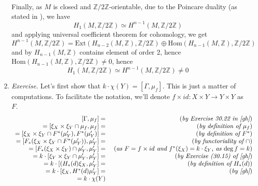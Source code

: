 \documentclass[8pt]{article} %
\newcommand{\Z}{\mathbb{Z}}
\newcommand{\tZ}{\mathbb{Z}/2\mathbb{Z}}
\newcommand{\Hom}{\mbox{Hom}}
\newcommand{\Ext}{\mbox{Ext}}
\begin{document}
\begin{enumerate}[label=\bfseries \arabic*.]
{		Finally, as $M$ is closed and $\tZ$-orientable, due to the Poincare duality (as stated in \cite[Theorem 3.30]{hatcher}), we have 
		\[H_1(M,\tZ)\simeq H^{n-1}(M,\tZ)\]
		and applying universal coefficient theorem for cohomology, we get
		\[H^{n-1}(M,\tZ)=\Ext(H_{n-2}(M,\Z),\tZ)\oplus\Hom(H_{n-1}(M,\Z),\tZ)\]
		and by \cite[Corollary 3.28]{hatcher} $H_{n-1}(M,\Z)$ contains element of order 2, hence $\Hom(H_{n-1}(M,\Z),\tZ)\neq0$, hence
		\[H_1(M,\tZ)\simeq H^{n-1}(M,\tZ)\neq0\]
		}
	\item{{\it Exercise. }Let's first show that $k\cdot\chi(Y)=[\Gamma,\mu_f]$. This is just a matter of computations. To facilitate the 
		notation, we'll denote $f\times id:X\times Y\to Y\times Y$ as $F$.
		\[\begin{array}{rr}
			[\Gamma,\mu_f]=&\myexplain{by Exercise 30.22 in \cite{gh}}\\
			=[\xi_X\times\xi_Y\cap\mu_f,\mu_f]=&\myexplain{by definition of $\mu_f$}\\
			=[\xi_X\times\xi_Y\cap F^*(\mu'_Y),F^*(\mu'_Y)]=&\myexplain{by definition of $F^*$}\\
			=[F_*(\xi_X\times\xi_Y\cap F^*(\mu'_Y)),\mu'_Y]=&\myexplain{by functoriality of $\cap$}\\
			=[F_*(\xi_X\times\xi_Y)\cap \mu'_Y,\mu'_Y]=&\myexplain{as $F=f\times id$ and $f^*(\xi_X)=k\cdot\xi_Y$, as $\deg f=k$}\\
			=k\cdot[\xi_Y\times\xi_Y\cap \mu'_Y,\mu'_Y]=&\myexplain{by Exercise (30.15) of \cite{gh}}\\
			=k\cdot[(H_*(d)\xi_X,\mu'_Y]=&\myexplain{by definition of $H_*(d)$}\\
			=k\cdot[\xi_X,H^*(d)\mu'_Y]=&\myexplain{by \cite[Corollary 30.10]{gh}}\\
			=k\cdot\chi(Y)&
		\end{array}\]
		
}
\end{enumerate}
\end{document}
